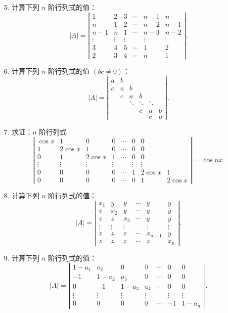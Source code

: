 \documentclass[UTF8,12pt,a4paper,fontset=fandol]{ctexart}
\begin{document}
5. 计算下列 $n$ 阶行列式的值：
\[
|A|=
\left|\begin{array}{cccccc}
1&2&3&\cdots&n-1&n\\
n&1&2&\cdots&n-2&n-1\\
n-1&n&1&\cdots&n-3&n-2\\
\vdots&\vdots&\vdots&&\vdots&\vdots\\
3&4&5&\cdots&1&2\\
2&3&4&\cdots&n&1
\end{array}\right|.
\]

6. 计算下列 $n$ 阶行列式的值 $(bc\ne0)$：
\[
|A|=
\left|\begin{array}{cccccc}
a&b&&&&\\
c&a&b&&&\\
&c&a&b&&\\
&&\ddots&\ddots&\ddots&\\
&&&c&a&b\\
&&&&c&a
\end{array}\right|.
\]

7. 求证：$n$ 阶行列式
\[
\left|\begin{array}{cccccccc}
\cos x&1&0&0&\cdots&0&0\\
1&2\cos x&1&0&\cdots&0&0\\
0&1&2\cos x&1&\cdots&0&0\\
\vdots&\vdots&\vdots&\vdots&&\vdots&\vdots\\
0&0&0&0&\cdots&1&2\cos x&1\\
0&0&0&0&\cdots&0&1&2\cos x
\end{array}\right|=\cos nx.
\]

8. 计算下列 $n$ 阶行列式的值：
\[
|A|=
\left|\begin{array}{cccccc}
x_1&y&y&\cdots&y&y\\
z&x_2&y&\cdots&y&y\\
z&z&x_3&\cdots&y&y\\
\vdots&\vdots&\vdots&&\vdots&\vdots\\
z&z&z&\cdots&x_{n-1}&y\\
z&z&z&\cdots&z&x_n
\end{array}\right|.
\]

9. 计算下列 $n$ 阶行列式的值：
\[
|A|=
\left|\begin{array}{ccccccc}
1-a_1&a_2&0&0&\cdots&0&0\\
-1&1-a_2&a_3&0&\cdots&0&0\\
0&-1&1-a_3&a_4&\cdots&0&0\\
\vdots&\vdots&\vdots&\vdots&&\vdots&\vdots\\
0&0&0&0&\cdots&-1&1-a_n
\end{array}\right|.
\]
\end{document}
